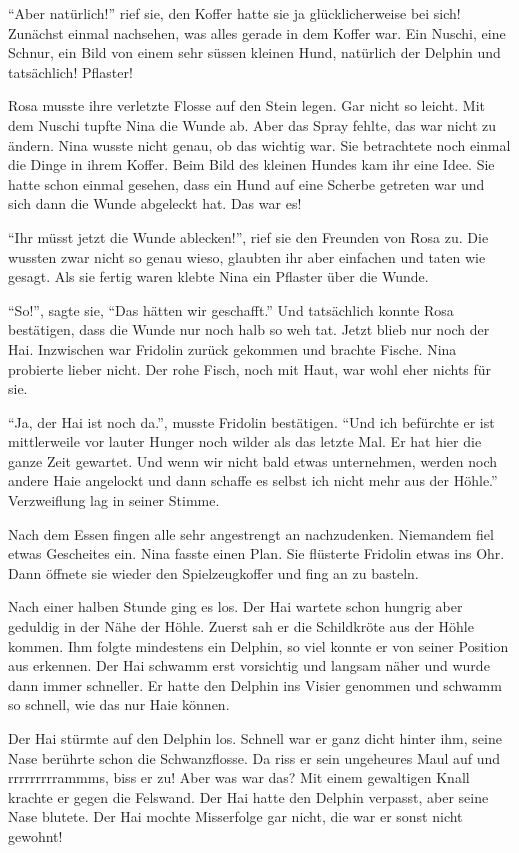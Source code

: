 \enquote{Aber natürlich!} rief sie, den Koffer hatte sie ja glücklicherweise bei sich! Zunächst einmal nachsehen, was alles gerade in dem Koffer war. Ein Nuschi, eine Schnur, ein Bild von einem sehr süssen kleinen Hund, natürlich der Delphin und tatsächlich! Pflaster! 

Rosa musste ihre verletzte Flosse auf den Stein legen. Gar nicht so leicht. Mit dem Nuschi tupfte Nina die Wunde ab. Aber das Spray fehlte, das war nicht zu ändern. Nina wusste nicht genau, ob das wichtig war. Sie betrachtete noch einmal die Dinge in ihrem Koffer. Beim Bild des kleinen Hundes kam ihr eine Idee. Sie hatte schon einmal gesehen, dass ein Hund auf eine Scherbe getreten war und sich dann die Wunde abgeleckt hat. Das war es!

\enquote{Ihr müsst jetzt die Wunde ablecken!}, rief sie den Freunden von Rosa zu. Die wussten zwar nicht so genau wieso, glaubten ihr aber einfachen und taten wie gesagt. Als sie fertig waren klebte Nina ein Pflaster über die Wunde.

\enquote{So!}, sagte sie, \enquote{Das hätten wir geschafft.} Und tatsächlich konnte Rosa bestätigen, dass die Wunde nur noch halb so weh tat. Jetzt blieb nur noch der Hai. Inzwischen war Fridolin zurück gekommen und brachte Fische. Nina probierte lieber nicht. Der rohe Fisch, noch mit Haut, war wohl eher nichts für sie.

\enquote{Ja, der Hai ist noch da.}, musste Fridolin bestätigen. \enquote{Und ich befürchte er ist mittlerweile vor lauter Hunger noch wilder als das letzte Mal. Er hat hier die ganze Zeit gewartet. Und wenn wir nicht bald etwas unternehmen, werden noch andere Haie angelockt und dann schaffe es selbst ich nicht mehr aus der Höhle.} Verzweiflung lag in seiner Stimme.

Nach dem Essen fingen alle sehr angestrengt an nachzudenken. Niemandem fiel etwas Gescheites ein. Nina fasste einen Plan. Sie flüsterte Fridolin etwas ins Ohr. Dann öffnete sie wieder den Spielzeugkoffer und fing an zu basteln. 

Nach einer halben Stunde ging es los. Der Hai wartete schon hungrig aber geduldig in der Nähe der Höhle. Zuerst sah er die Schildkröte aus der Höhle kommen. Ihm folgte mindestens ein Delphin, so viel konnte er von seiner Position aus erkennen. Der Hai schwamm erst vorsichtig und langsam näher und wurde dann immer schneller. Er hatte den Delphin ins Visier genommen und schwamm so schnell, wie das nur Haie können.

Der Hai stürmte auf den Delphin los. Schnell war er ganz dicht hinter ihm, seine Nase berührte schon die Schwanzflosse. Da riss er sein ungeheures Maul auf und rrrrrrrrrammms, biss er zu! Aber was war das? Mit einem gewaltigen Knall krachte er gegen die Felswand. Der Hai hatte den Delphin verpasst, aber seine Nase blutete. Der Hai mochte Misserfolge gar nicht, die war er sonst nicht gewohnt!

